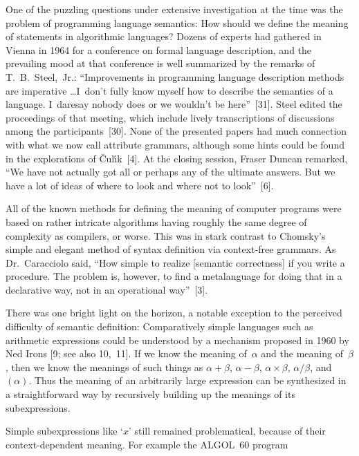 One of the puzzling questions under extensive investigation at the
time
was the problem of programming language semantics: How should we
define
the meaning of statements in algorithmic languages? Dozens of experts
had gathered in Vienna in 1964 for a conference on formal language
description, and the prevailing mood at that conference is well
summarized by the remarks of T.~B.~Steel,~Jr.:
``Improvements in programming language description methods
are imperative \dots \enspace I~don't fully know myself how to
describe
the semantics of a language. I~daresay nobody does or we wouldn't
be here''~[31].  
Steel edited the proceedings of that meeting, which include lively
transcriptions of discussions among the participants~[30].
None of the presented papers had much connection with what we now call
attribute grammars, although some hints could be found in the
explorations of {\v C}ul\'{\i}k~[4].
At the closing session, Fraser Duncan remarked,
``We have not actually got all or perhaps any of the ultimate
answers. But we have a lot of ideas of where to look and where not
to look''~[6].

All of the known methods for defining the meaning of computer programs
were based on rather intricate algorithms having roughly the same
degree of complexity as compilers, or worse. This was in stark
contrast to Chomsky's simple and elegant method of syntax definition
via context-free grammars. As Dr.~Caracciolo said, ``How simple to
realize [semantic correctness] if you write a procedure. The problem
is, however, to find a metalanguage for doing that in a declarative
way, not in an operational way''~[3].

There was one bright light on the horizon, a notable exception to the
perceived difficulty of semantic definition: Comparatively simple
languages such as arithmetic expressions could be understood by a
mechanism proposed in 1960 by Ned Irons 
[9; see also 10,~11].
If we know the meaning of~$\alpha$ and the meaning of~$\beta$, then we
know the meanings of such things as $\alpha +\beta$, $\alpha-\beta$,
$\alpha\times\beta$, $\alpha/\beta$, and $(\alpha)$. Thus the meaning
of an arbitrarily large expression can be synthesized in a 
straightforward way by recursively building up the meanings of its
subexpressions. 

Simple subexpressions like `$x$' still remained problematical, because
of their context-dependent meaning. For example the 
{\ninerm ALGOL}~60 program


